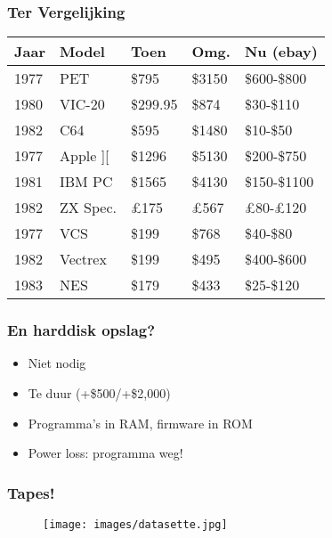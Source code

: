 \documentclass[aspectratio=43]{uva-inf-presentation}
\begin{document}
\begin{frame}
\frametitle{Ter Vergelijking}

\begin{tabular}{|l|l|l|l|l|}
\hline Jaar & Model & Toen & Omg. & Nu (ebay) \\ \hline
1977 & PET & \$795 & \$3150 & \$600-\$800 \\
1980 & VIC-20 & \$299.95 & \$874 & \$30-\$110 \\
1982 & C64 & \$595 & \$1480 & \$10-\$50 \\ \hline
1977 & Apple ][ & \$1296 & \$5130 & \$200-\$750 \\
1981 & IBM PC & \$1565 & \$4130 & \$150-\$1100 \\
1982 & ZX Spec. & \pounds 175 & \pounds 567 & \pounds 80-\pounds 120 \\ \hline
1977 & VCS & \$199 & \$768 & \$40-\$80 \\
1982 & Vectrex & \$199 & \$495 & \$400-\$600 \\
1983 & NES & \$179 & \$433 & \$25-\$120 \\ \hline
\end{tabular}

\end{frame}


\begin{frame}
\frametitle{En harddisk opslag?}

\begin{itemize}
\item Niet nodig
\item Te duur (+\$500/+\$2,000)
\item Programma's in RAM, firmware in ROM
\item Power loss: programma weg!
\end{itemize}

\end{frame}


\begin{frame}
\frametitle{Tapes!}

\begin{figure}
\texttt{[image: images/datasette.jpg]}
\end{figure}

\end{frame}

\end{document}
